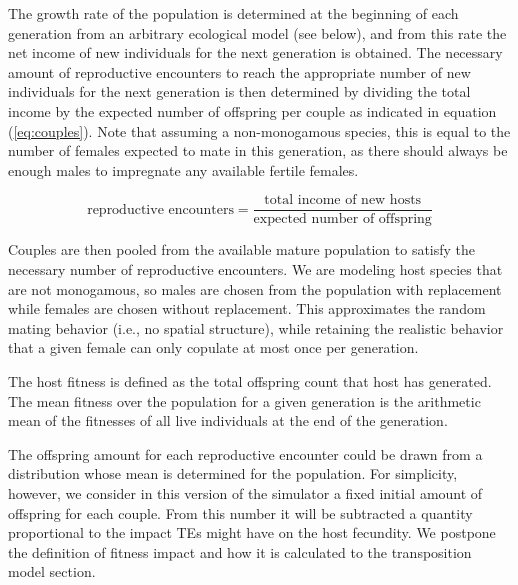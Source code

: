 \documentclass[10pt]{article}
\begin{document}
The growth rate of the population is determined at the beginning of
each generation from an arbitrary ecological model (see below), and
from this rate the net income of new individuals for the next
generation is obtained. The necessary amount of reproductive
encounters to reach the appropriate number of new individuals for the
next generation is then determined by dividing the total income by the
expected number of offspring per couple as indicated in equation
(\ref{eq:couples}). Note that assuming a non-monogamous species, this
is equal to the number of females expected to mate in this generation,
as there should always be enough males to impregnate any available
fertile females.

\begin{equation}
  \label{eq:couples}
  \mbox{reproductive encounters} = 
  \frac{\mbox{total income of new hosts}}
       {\mbox{expected number of offspring}} 
\end{equation}

Couples are then pooled from the available mature population to
satisfy the necessary number of reproductive encounters. We are
modeling host species that are not monogamous, so males are chosen
from the population with replacement while females are chosen without
replacement. This approximates the random mating behavior (i.e., no
spatial structure), while retaining the realistic behavior that a
given female can only copulate at most once per generation.


The host fitness is defined as the total offspring count that host has
generated. The mean fitness over the population for a given generation
is the arithmetic mean of the fitnesses of all live individuals at the
end of the generation.

The offspring amount for each reproductive encounter could be drawn
from a distribution whose mean is determined for the population. For
simplicity, however, we consider in this version of the simulator a
fixed initial amount of offspring for each couple. From this number it
will be subtracted a quantity proportional to the impact TEs might
have on the host fecundity. We postpone the definition of fitness
impact and how it is calculated to the transposition model section.
\end{document}
